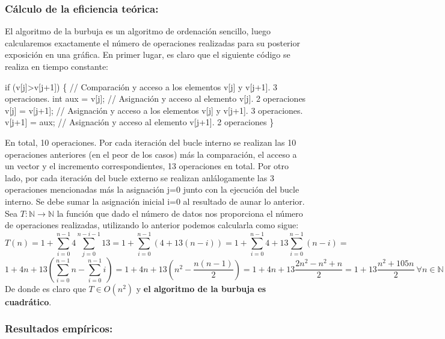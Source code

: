 \documentclass[]{article}
\newenvironment{Shaded}{\begin{snugshade}}{\end{snugshade}}
\newcommand{\KeywordTok}[1]{\textcolor[rgb]{0.94,0.87,0.69}{{#1}}}
\newcommand{\DataTypeTok}[1]{\textcolor[rgb]{0.87,0.87,0.75}{{#1}}}
\newcommand{\DecValTok}[1]{\textcolor[rgb]{0.86,0.86,0.80}{{#1}}}
\newcommand{\CommentTok}[1]{\textcolor[rgb]{0.50,0.62,0.50}{{#1}}}
\newcommand{\NormalTok}[1]{\textcolor[rgb]{0.80,0.80,0.80}{{#1}}}
\begin{document}
\subsubsection{Cálculo de la eficiencia
teórica:}\label{calculo-de-la-eficiencia-teorica}

El algoritmo de la burbuja es un algoritmo de ordenación sencillo, luego
calcularemos exactamente el número de operaciones realizadas para su
posterior exposición en una gráfica. En primer lugar, es claro que el
siguiente código se realiza en tiempo constante:

\begin{Shaded}
\begin{Highlighting}[]
\KeywordTok{if} \NormalTok{(v[j]>v[j}\DecValTok{+1}\NormalTok{]) \{ }\CommentTok{// Comparación y acceso a los elementos v[j] y v[j+1]. 3 operaciones.}
    \DataTypeTok{int} \NormalTok{aux = v[j]; }\CommentTok{// Asignación y acceso al elemento v[j]. 2 operaciones}
    \NormalTok{v[j] = v[j}\DecValTok{+1}\NormalTok{]; }\CommentTok{// Asignación y acceso a los elementos v[j] y v[j+1]. 3 operaciones.}
    \NormalTok{v[j}\DecValTok{+1}\NormalTok{] = aux; }\CommentTok{// Asignación y acceso al elemento v[j+1]. 2 operaciones}
\NormalTok{\}}
\end{Highlighting}
\end{Shaded}

En total, 10 operaciones. Por cada iteración del bucle interno se
realizan las 10 operaciones anteriores (en el peor de los casos) más la
comparación, el acceso a un vector y el incremento correspondientes, 13
operaciones en total. Por otro lado, por cada iteración del bucle
externo se realizan anlálogamente las 3 operaciones mencionadas más la
asignación j=0 junto con la ejecución del bucle interno. Se debe sumar
la asignación inicial i=0 al resultado de aunar lo anterior. Sea
$T: \mathbb{N} \rightarrow \mathbb{N}$ la función que dado el número de
datos nos proporciona el número de operaciones realizadas, utilizando lo
anterior podemos calcularla como sigue:
\[ T(n) = 1 + \sum_{i=0}^{n-1}4\sum_{j=0}^{n-i-1}13 = 1 + \sum_{i=0}^{n-1}(4+13(n-i)) = 1 + \sum_{i=0}^{n-1}4 + 13\sum_{i=0}^{n-1}(n-i)= \]
\[ 1 + 4n + 1   3\left(\sum_{i=0}^{n-1}n - \sum_{i=0}^{n-1}i\right) = 1 + 4n + 13(n^2 - \frac{n(n-1)}{2}) = 1 + 4n + 13\frac{2n^2 - n^2 + n}{2} = 1  + 13\frac{n^2 + 105n}{2} \ \forall n \in \mathbb{N} \]
De donde es claro que $T \in O(n^2)$ y \textbf{el algoritmo de la
burbuja es cuadrático}.

\subsubsection{Resultados empíricos:}\label{resultados-empiricos}
\end{document}
